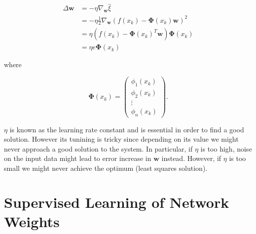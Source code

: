 \documentclass[letterpaper, 10 pt, conference]{ieeeconf}  %
\begin{document}
\begin{equation} \nonumber
\begin{split}
\Delta \textbf{w} &= -\eta \nabla_\textbf{w} \hat{\xi} \\
&= -\eta \frac{1}{2}\nabla_\textbf{w}(f(x_k)-\boldsymbol{\Phi}(x_k)\textbf{w})^2 \\
&= \eta(f(x_k)-\boldsymbol{\Phi}(x_k)^T\textbf{w})\boldsymbol{\Phi}(x_k) \\
&= \eta e \boldsymbol{\Phi}(x_k) 
\end{split}
\end{equation}

where 

\begin{equation} \nonumber
\boldsymbol{\Phi}(x_k) =
\begin{pmatrix}
\phi_1(x_k) \\
\phi_2(x_k) \\
\vdots \\
\phi_n(x_k)
\end{pmatrix}.
\end{equation}

$\eta$ is known as the learning rate constant and is essential in order to find a good solution. However its tunining is tricky since depending on its value we might never approach a good solution to the system. In particular, if $\eta$ is too high, noise on the input data might lead to error increase in $\textbf{w}$ instead. However, if $\eta$ is too small we might never achieve the optimum (least squares solution).
\cite{etzioni2011less}

\section{Supervised Learning of Network Weights}



\end{document}
